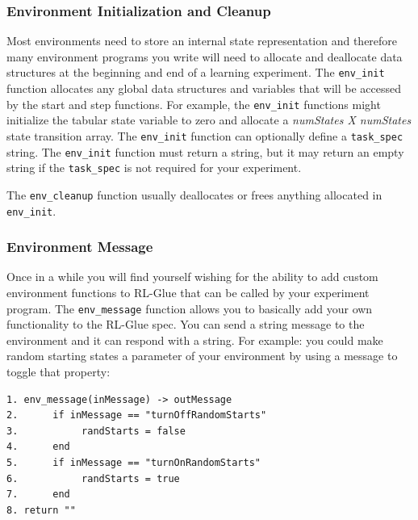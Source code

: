 \documentclass[11pt]{article}
\begin{document}
%

        
\subsubsection{Environment Initialization and Cleanup}        
Most environments need to store an internal state representation and therefore many environment programs you write will need to allocate and deallocate data structures at the beginning and end of a learning experiment. The \texttt{env\_init} function allocates any global data structures and variables that will be accessed by the start and step functions. For example, the \texttt{env\_init} functions might initialize the tabular state variable to zero and allocate a {\it numStates X numStates} state transition array. The \texttt{env\_init} function can optionally define a \texttt{task\_spec} string. The \texttt{env\_init} function must return a string, but it may return an empty string if the \texttt{task\_spec} is not required for your experiment.

The \texttt{env\_cleanup} function usually deallocates or frees anything allocated in \texttt{env\_init}.

\subsubsection{Environment Message}
Once in a while you will find yourself wishing for the ability to add custom environment functions to RL-Glue that can be called by your experiment program. The \texttt{env\_message} function allows you to basically add your own functionality to the RL-Glue spec. You can send a string message to the environment and it can respond with a string. For example: you could make random starting states a parameter of your environment by using a message to toggle that property:
\begin{verbatim}
1. env_message(inMessage) -> outMessage
2.      if inMessage == "turnOffRandomStarts"  
3.           randStarts = false
4.      end 
5.      if inMessage == "turnOnRandomStarts"  
6.           randStarts = true
7.      end 
8. return ""
\end{verbatim}
\end{document}
